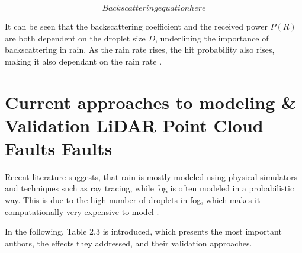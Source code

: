 \begin{equation}
    Backscattering equation here 
\end{equation}

It can be seen that the backscattering coefficient and the received power $P(R)$ are both dependent on the droplet size $D$, underlining the importance of backscattering in rain. As the rain rate rises, the hit probability also rises, making it also dependant on the rain rate \cite{haider_methodology_2023}. 




\section{Current approaches to modeling \& Validation LiDAR Point Cloud Faults Faults}


Recent literature suggests, that rain is mostly modeled using physical simulators and techniques such as ray tracing, while fog is often modeled in a probabilistic way. This is due to the high number of droplets in fog, which makes it computationally very expensive to model \cite{teufel_simulating_2022}.  

In the following, Table 2.3 is introduced, which presents the most important authors, the effects they addressed, and their validation approaches. 

